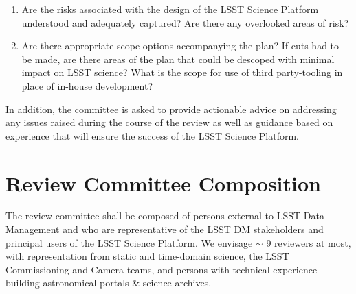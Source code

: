 \documentclass[DM,STS,toc]{lsstdoc}
\begin{document}
\begin{enumerate}
\item Are the risks associated with the design of the LSST Science Platform understood and adequately captured? Are there any overlooked areas of risk?
%
\item Are there appropriate scope options accompanying the plan? 
If cuts had to be made, are there areas of the plan that could be descoped with minimal impact on LSST science?
What is the scope for use of third party-tooling in place of in-house development? 

\end{enumerate}

In addition, the committee is asked to provide actionable advice on addressing any issues raised during the course of the review as well as guidance based on experience that will ensure the success of the LSST Science Platform.

\section{Review Committee Composition}
The review committee shall be composed of persons external to LSST Data Management
and who are representative of the LSST DM stakeholders and principal users of the LSST Science Platform. 
We envisage $\sim$ 9 reviewers at most, with representation from static and time-domain science, the LSST Commissioning and Camera teams,  
and persons with technical experience building astronomical portals \& science archives. 

\end{document}
